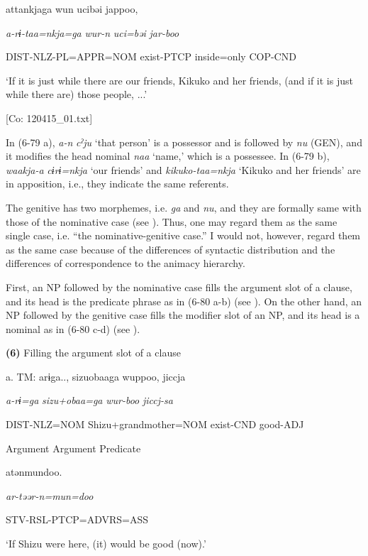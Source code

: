       attankjaga  wun  ucibəi  jappoo,

      \textit{a-rɨ-taa=nkja=ga}  \textit{wur-n}  \textit{uci=bəi}  \textit{jar-boo}

      DIST-NLZ-PL=APPR=NOM  exist-PTCP  inside=only  COP-CND

      ‘If it is just while there are our friends, Kikuko and her friends, (and if it is just while there are) those people, ...’

      [Co: 120415\_01.txt]

In (6-79 a), \textit{a-n} \textit{cˀju} ‘that person’ is a possessor and is followed by \textit{nu} (GEN), and it modifies the head nominal \textit{naa} ‘name,’ which is a possessee. In (6-79 b), \textit{waakja-a} \textit{cɨrɨ=nkja} ‘our friends’ and \textit{kikuko-taa=nkja} ‘Kikuko and her friends’ are in apposition, i.e., they indicate the same referents.

The genitive has two morphemes, i.e. \textit{ga} and \textit{nu}, and they are formally same with those of the nominative case (see ). Thus, one may regard them as the same single case, i.e. “the nominative-genitive case.” I would not, however, regard them as the same case because of  the differences of syntactic distribution and  the differences of correspondence to the animacy hierarchy.

First, an NP followed by the nominative case fills the argument slot of a clause, and its head is the predicate phrase as in (6-80 a-b) (see ). On the other hand, an NP followed by the genitive case fills the modifier slot of an NP, and its head is a nominal as in (6-80 c-d) (see ).

\textbf{(6)}  Filling the argument slot of a clause

  a.  TM:  arɨga..,  sizuobaaga  wuppoo,  jiccja

      \textit{a-rɨ=ga}  \textit{sizu+obaa=ga}  \textit{wur-boo}  \textit{jiccj-sa}

      DIST-NLZ=NOM  Shizu+grandmother=NOM  exist-CND  good-ADJ

      Argument  Argument  Predicate  

      atənmundoo.

      \textit{ar-təər-n=mun=doo}

      STV-RSL-PTCP=ADVRS=ASS

      ‘If Shizu were here, (it) would be good (now).’

